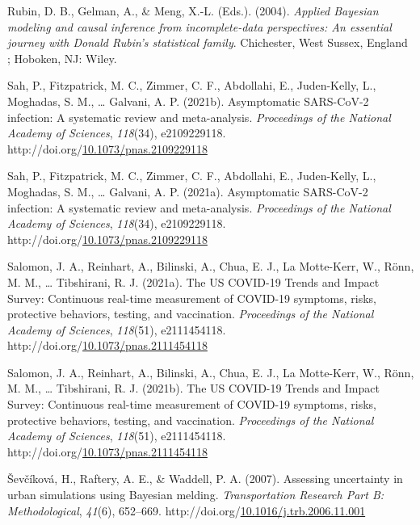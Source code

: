 \documentclass[12pt,twoside]{smiththesis}
\newlength{\cslhangindent}
\newenvironment{CSLReferences}[2] %
 {%
\setlength{\parindent}{0pt}
\ifodd #1 \everypar{\setlength{\hangindent}{\cslhangindent}}\ignorespaces\fi
\ifnum #2 > 0
\setlength{\parskip}{#2\baselineskip}
  \fi
}%
{}
\begin{document}
\begin{CSLReferences}{1}{0}
\leavevmode{}%
Rubin, D. B., Gelman, A., \& Meng, X.-L. (Eds.). (2004). \emph{Applied {Bayesian} modeling and causal inference from incomplete-data perspectives: An essential journey with {Donald Rubin}'s statistical family}. {Chichester, West Sussex, England ; Hoboken, NJ}: {Wiley}.

\leavevmode{}%
Sah, P., Fitzpatrick, M. C., Zimmer, C. F., Abdollahi, E., Juden-Kelly, L., Moghadas, S. M., \ldots{} Galvani, A. P. (2021b). Asymptomatic {SARS-CoV-2} infection: {A} systematic review and meta-analysis. \emph{Proceedings of the National Academy of Sciences}, \emph{118}(34), e2109229118. http://doi.org/\href{https://doi.org/10.1073/pnas.2109229118}{10.1073/pnas.2109229118}

\leavevmode{}%
Sah, P., Fitzpatrick, M. C., Zimmer, C. F., Abdollahi, E., Juden-Kelly, L., Moghadas, S. M., \ldots{} Galvani, A. P. (2021a). Asymptomatic {SARS-CoV-2} infection: {A} systematic review and meta-analysis. \emph{Proceedings of the National Academy of Sciences}, \emph{118}(34), e2109229118. http://doi.org/\href{https://doi.org/10.1073/pnas.2109229118}{10.1073/pnas.2109229118}

\leavevmode{}%
Salomon, J. A., Reinhart, A., Bilinski, A., Chua, E. J., La Motte-Kerr, W., Rönn, M. M., \ldots{} Tibshirani, R. J. (2021a). The {US COVID-19 Trends} and {Impact Survey}: {Continuous} real-time measurement of {COVID-19} symptoms, risks, protective behaviors, testing, and vaccination. \emph{Proceedings of the National Academy of Sciences}, \emph{118}(51), e2111454118. http://doi.org/\href{https://doi.org/10.1073/pnas.2111454118}{10.1073/pnas.2111454118}

\leavevmode{}%
Salomon, J. A., Reinhart, A., Bilinski, A., Chua, E. J., La Motte-Kerr, W., Rönn, M. M., \ldots{} Tibshirani, R. J. (2021b). The {US COVID-19 Trends} and {Impact Survey}: {Continuous} real-time measurement of {COVID-19} symptoms, risks, protective behaviors, testing, and vaccination. \emph{Proceedings of the National Academy of Sciences}, \emph{118}(51), e2111454118. http://doi.org/\href{https://doi.org/10.1073/pnas.2111454118}{10.1073/pnas.2111454118}

\leavevmode{}%
Ševčíková, H., Raftery, A. E., \& Waddell, P. A. (2007). Assessing uncertainty in urban simulations using {Bayesian} melding. \emph{Transportation Research Part B: Methodological}, \emph{41}(6), 652--669. http://doi.org/\href{https://doi.org/10.1016/j.trb.2006.11.001}{10.1016/j.trb.2006.11.001}


\end{CSLReferences}
\end{document}
